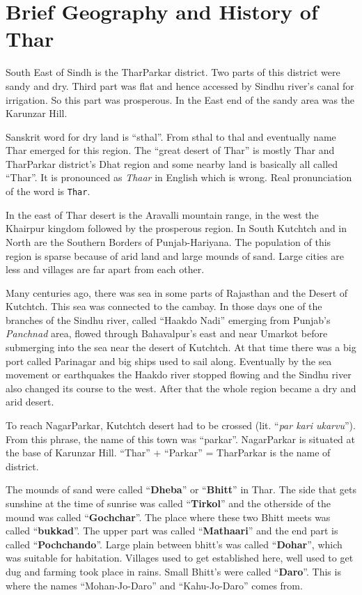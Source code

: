 \chapter{Brief Geography and History of Thar}
South East of Sindh is the TharParkar district. Two parts of this district were sandy and dry. Third part was flat and hence accessed by Sindhu river's canal for irrigation. So this part was prosperous. In the East end of the sandy area was the Karunzar Hill.

Sanskrit word for dry land is ``sthal''. From sthal to thal and eventually name Thar emerged for this region. The ``great desert of Thar'' is mostly Thar and TharParkar district's Dhat region and some nearby land is basically all called ``Thar''. It is pronounced as \textit{Thaar} in English which is wrong. Real pronunciation of the word is \texttt{Thar}.

In the east of Thar desert is the Aravalli mountain range, in the west the Khairpur kingdom followed by the prosperous region. In South Kutchtch and in North are the Southern Borders of Punjab-Hariyana. The population of this region is sparse because of arid land and large mounds of sand. Large cities are less and villages are far apart from each other.

Many centuries ago, there was sea in some parts of Rajasthan and the Desert of Kutchtch. This sea was connected to the cambay. In those days one of the branches of the Sindhu river, called ``Haakdo Nadi'' emerging from Punjab's \textit{Panchnad} area, flowed through Bahavalpur's east and near Umarkot before submerging into the sea near the desert of Kutchtch. At that time there was a big port called Parinagar and big ships used to sail along. Eventually by the sea movement or earthquakes the Haakdo river stopped flowing and the Sindhu river also changed its course to the west. After that the whole region became a dry and arid desert.

To reach NagarParkar, Kutchtch desert had to be crossed (lit. ``\textit{par kari ukarvu}''). From this phrase, the name of this town was ``parkar''. NagarParkar is situated at the base of Karunzar Hill. ``Thar'' + ``Parkar'' = TharParkar is the name of district.

The mounds of sand were called ``\textbf{Dheba}'' or ``\textbf{Bhitt}'' in Thar. The side that gets sunshine at the time of sunrise was called ``\textbf{Tirkol}'' and the otherside of the mound was called ``\textbf{Gochchar}''. The place where these two Bhitt meets was called ``\textbf{bukkad}''. The upper part was called ``\textbf{Mathaari}'' and the end part is called  ``\textbf{Pochchando}''. Large plain between bhitt's was called ``\textbf{Dohar}'', which was suitable for habitation. Villages used to get established here, well used to get dug and farming took place in rains. Small Bhitt's were called ``\textbf{Daro}''. This is where the names ``Mohan-Jo-Daro'' and ``Kahu-Jo-Daro'' comes from.

